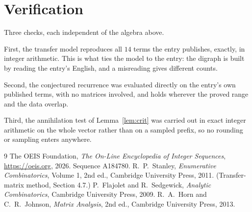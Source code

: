 \documentclass[11pt,a4paper]{article}
\theoremstyle{plain}
\theoremstyle{definition}
\begin{document}
\section{Verification}

Three checks, each independent of the algebra above.

First, the transfer model reproduces all $14$ terms the entry publishes, exactly, in
integer arithmetic. This is what ties the model to the entry: the digraph is built by reading
the entry's English, and a misreading gives different counts.

Second, the conjectured recurrence was evaluated directly on the entry's own published terms,
with no matrices involved, and holds wherever the proved range and the data overlap.

Third, the annihilation test of Lemma~\ref{lem:crit} was carried out in exact integer
arithmetic on the whole vector rather than on a sampled prefix, so no rounding or sampling
enters anywhere.

\begin{thebibliography}{9}
 The OEIS Foundation, \emph{The On-Line Encyclopedia of Integer
Sequences}, \url{https://oeis.org}, 2026. Sequence A184780.
 R.~P.~Stanley, \emph{Enumerative Combinatorics}, Volume 1, 2nd ed.,
Cambridge University Press, 2011. (Transfer-matrix method, Section 4.7.)
 P.~Flajolet and R.~Sedgewick, \emph{Analytic Combinatorics}, Cambridge
University Press, 2009.
 R.~A.~Horn and C.~R.~Johnson, \emph{Matrix Analysis}, 2nd ed., Cambridge
University Press, 2013.
\end{thebibliography}
\end{document}
